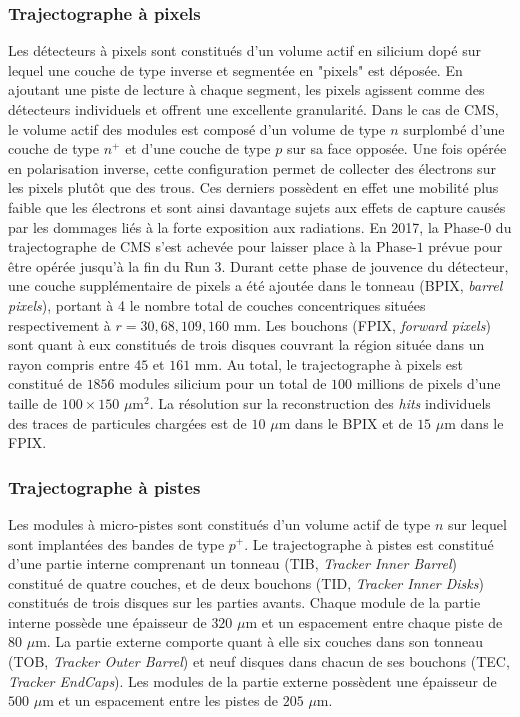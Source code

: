\subsubsection{ Trajectographe à pixels}

Les détecteurs à pixels sont constitués d'un volume actif en silicium dopé sur lequel une couche de type inverse et segmentée en "pixels" est déposée. En ajoutant une piste de lecture à chaque segment, les pixels agissent comme des détecteurs individuels et offrent une excellente granularité. Dans le cas de CMS, le volume actif des modules est composé d'un volume de type $n$ surplombé d'une couche de type $n^+$  et d'une couche de type $p$ sur sa face opposée. Une fois opérée en polarisation inverse, cette configuration permet de collecter des électrons sur les pixels plutôt que des trous. Ces derniers possèdent en effet une mobilité plus faible que les électrons et sont ainsi davantage sujets aux effets de capture causés par les dommages liés à la forte exposition aux radiations. En 2017, la Phase-$0$ du trajectographe de CMS s'est achevée pour laisser place à la Phase-$1$ prévue pour être opérée jusqu'à la fin du Run 3. Durant cette phase de jouvence du détecteur, une couche supplémentaire de pixels a été ajoutée dans le tonneau (BPIX, \textit{barrel pixels}), portant à 4 le nombre total de couches concentriques situées respectivement à $r=30,68,109,160$ mm. Les bouchons (FPIX, \textit{forward pixels}) sont quant à eux constitués de trois disques couvrant la région située dans un rayon compris entre $45$ et $161$ mm. Au total, le trajectographe à pixels est constitué de $1856$ modules silicium pour un total de $100$ millions de pixels d'une taille de $100\times150$ $\mu$m$^2$. La résolution sur la reconstruction des \textit{hits} individuels des traces de particules chargées est de $10$ $\mu$m dans le BPIX et de $15$ $\mu$m dans le FPIX.

\subsubsection{ Trajectographe à pistes}

Les modules à micro-pistes sont constitués d'un volume actif de type $n$ sur lequel sont implantées des bandes de type $p^+$. Le trajectographe à pistes est constitué d'une partie interne comprenant un tonneau (TIB, \textit{Tracker Inner Barrel}) constitué de quatre couches, et de deux bouchons (TID, \textit{Tracker Inner Disks}) constitués de trois disques sur les parties avants. Chaque module de la partie interne possède une épaisseur de $320$ $\mu$m et un espacement entre chaque piste de $80$ $\mu$m. La partie externe comporte quant à elle six couches dans son tonneau (TOB, \textit{Tracker Outer Barrel}) et neuf disques dans chacun de ses bouchons (TEC, \textit{Tracker EndCaps}). Les modules de la partie externe possèdent une épaisseur de $500$ $\mu$m et un espacement entre les pistes de $205$ $\mu$m. \\

